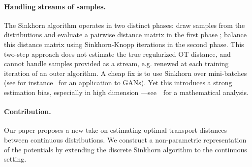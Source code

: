 \paragraph{Handling streams of samples.} The Sinkhorn algorithm operates in two
distinct phases: draw samples from the distributions and evaluate a pairwise distance matrix in the
first phase ; balance this distance matrix using Sinkhorn-Knopp iterations in
the second phase. This two-step approach does not estimate the true regularized OT distance, and cannot handle samples provided as a stream, e.g. renewed
at each training iteration of an outer algorithm. A cheap fix is to use Sinkhorn over mini-batches
(see for instance~\citet{2018-Genevay-aistats} for an application to GANs). Yet
this introduces a strong estimation bias, especially in high dimension
---see~\citet{fatras2019learning} for a mathematical analysis. 


\paragraph{Contribution.}

Our paper proposes a new take on estimating optimal transport distances between continuous distributions. We construct a
non-parametric representation of the potentials by extending the discrete Sinkhorn algorithm to the continuous setting.


